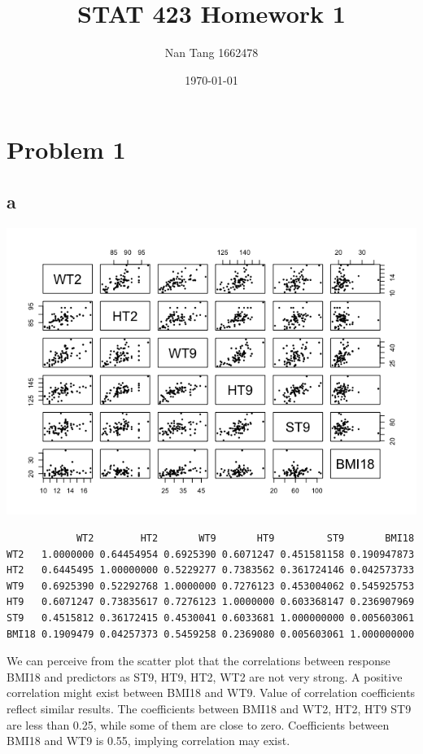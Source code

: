 \documentclass[11pt,letterpaper]{article}
\title{STAT 423 Homework 1}
\author{Nan Tang 1662478}
\date{\today}
\begin{document}
\maketitle

\section*{Problem 1}
\subsection*{a}
\includegraphics[scale=0.7]{1-a-1.png}
\begin{verbatim}
            WT2        HT2       WT9       HT9         ST9       BMI18
WT2   1.0000000 0.64454954 0.6925390 0.6071247 0.451581158 0.190947873
HT2   0.6445495 1.00000000 0.5229277 0.7383562 0.361724146 0.042573733
WT9   0.6925390 0.52292768 1.0000000 0.7276123 0.453004062 0.545925753
HT9   0.6071247 0.73835617 0.7276123 1.0000000 0.603368147 0.236907969
ST9   0.4515812 0.36172415 0.4530041 0.6033681 1.000000000 0.005603061
BMI18 0.1909479 0.04257373 0.5459258 0.2369080 0.005603061 1.000000000
\end{verbatim}

\noindent We can perceive from the scatter plot that the correlations between response BMI18 and predictors as ST9, HT9, HT2, WT2 are not very strong. A positive correlation might exist between BMI18 and WT9. Value of correlation coefficients reflect similar results. The coefficients between BMI18 and WT2, HT2, HT9 ST9 are less than 0.25, while some of them are close to zero. Coefficients between BMI18 and WT9 is 0.55, implying correlation may exist. \\
\end{document}
